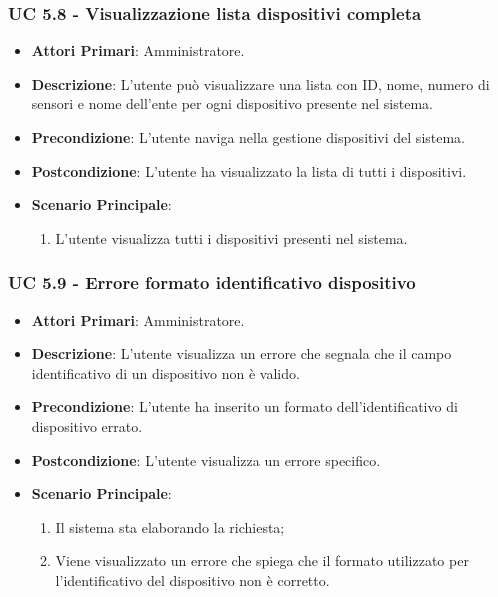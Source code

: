 			\subsubsection{UC 5.8 - Visualizzazione lista dispositivi completa}
			\begin{itemize}
				\item \textbf{Attori Primari}: Amministratore.
				\item \textbf{Descrizione}: L'utente può visualizzare una lista con ID, nome, numero di sensori e nome dell'ente per ogni dispositivo presente nel sistema.
				\item \textbf{Precondizione}: L'utente naviga nella gestione dispositivi del sistema.
				\item \textbf{Postcondizione}: L'utente ha visualizzato la lista di tutti i dispositivi.
				\item \textbf{Scenario Principale}:
				\begin{enumerate}
					\item{L'utente visualizza tutti i dispositivi presenti nel sistema.}
				\end{enumerate}
			\end{itemize}

			\subsubsection{UC 5.9 - Errore formato identificativo dispositivo}
			\begin{itemize}
				\item \textbf{Attori Primari}: Amministratore.
				\item \textbf{Descrizione}: L'utente visualizza un errore che segnala che il campo identificativo di un dispositivo non è valido.
				\item \textbf{Precondizione}: L'utente ha inserito un formato dell'identificativo di dispositivo errato.
				\item \textbf{Postcondizione}: L'utente visualizza un errore specifico.
				\item \textbf{Scenario Principale}:
				\begin{enumerate}
					\item Il sistema sta elaborando la richiesta;
					\item Viene visualizzato un errore che spiega che il formato utilizzato per l'identificativo del dispositivo non è corretto.
				\end{enumerate}
			\end{itemize}